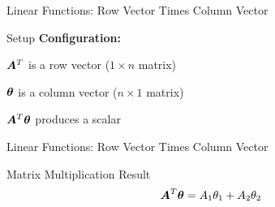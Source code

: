 \documentclass{beamer}
\begin{document}
\begin{frame}{Linear Functions: Row Vector Times Column Vector}
\begin{definitionbox}{Setup}
\textbf{Configuration:}
\cleanitemize
{
    \item $\bm{A} ^T$ is a row vector ($1 \times n$ matrix)
    \item $\bm{\theta}$ is a column vector ($n \times 1$ matrix) 
    \item $\bm{A}^T\bm{\bm{\theta}}$ produces a scalar
}
\end{definitionbox}

\end{frame}

\begin{frame}{Linear Functions: Row Vector Times Column Vector}
\begin{keypointsbox}{Matrix Multiplication Result}
$$\bm{A}^T \bm{\theta} = A_{1}\theta_{1} + A_{2}\theta_{2}$$
\end{keypointsbox}

\end{frame}
\end{document}
